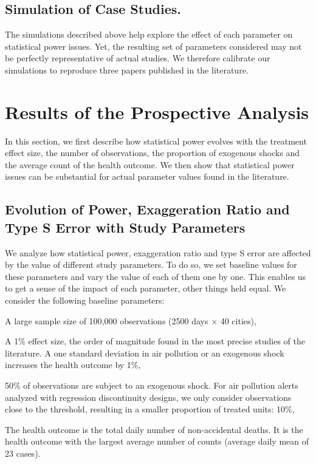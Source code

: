 \documentclass[12pt]{article}
\newenvironment{sitemize}{\itemize\addtolength{\itemsep}{-10pt}}{\enditemize} %
\begin{document}
        \subsection{Simulation of Case Studies.} The simulations described above help explore the effect of each parameter on statistical power issues. Yet, the resulting set of parameters considered may not be perfectly representative of actual studies. We therefore calibrate our simulations to reproduce three papers published in the literature.




\section{Results of the Prospective Analysis}

        In this section, we first describe how statistical power evolves with the treatment effect size, the number of observations, the proportion of exogenous shocks and the average count of the health outcome. We then show that statistical power issues can be substantial for actual parameter values found in the literature. 

        \subsection{Evolution of Power, Exaggeration Ratio and Type S Error with Study Parameters}

        We analyze how statistical power, exaggeration ratio and type S error are affected by the value of different study parameters. To do so, we set baseline values for these parameters and vary the value of each of them one by one. This enables us to get a sense of the impact of each parameter, other things held equal. We consider the following baseline parameters:
            
            \begin{sitemize}
                \item A large sample size of 100,000 observations (2500 days × 40 cities),
                \item A 1\% effect size, the order of magnitude found in the most precise studies of the literature. A one standard deviation in air pollution or an exogenous shock increases the health outcome by 1\%,
                \item 50\% of observations are subject to an exogenous shock. For air pollution alerts analyzed with regression discontinuity designs, we only consider observations close to the threshold, resulting in a smaller proportion of treated units: 10\%,
                \item The health outcome is the total daily number of non-accidental deaths. It is the health outcome with the largest average number of counts (average daily mean of 23 cases).
            \end{sitemize}
            
\end{document}
